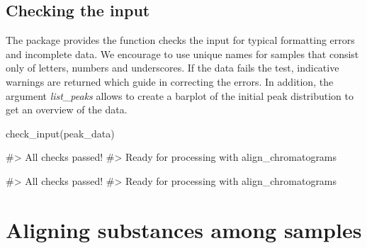 \subsection{Checking the input}

The package provides the function  checks the
input for typical formatting errors and incomplete data. We encourage to
use unique names for samples that consist only of letters, numbers and
underscores. If the data fails the test, indicative warnings are
returned which guide in correcting the errors. In addition, the argument
\textit{list{\_}peaks} allows to create a barplot of the initial peak
distribution to get an overview of the data.

\begin{Schunk}
\begin{Sinput}
check_input(peak_data)
\end{Sinput}
\begin{Soutput}
#> All checks passed!
#> Ready for processing with align_chromatograms
\end{Soutput}
\begin{Sinput}
#> All checks passed!
#> Ready for processing with align_chromatograms
\end{Sinput}
\end{Schunk}

\section{Aligning substances among samples}

